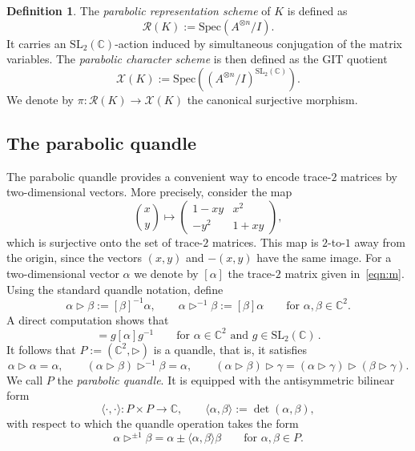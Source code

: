 \documentclass[12pt,reqno]{amsart}
\newcommand{\BC}{\mathbb{C}}
\newcommand{\calX}{\mathcal{X}}
\newcommand{\calR}{\mathcal{R}}
\newcommand{\SL}{\mathrm{SL}}
\theoremstyle{definition}
\newtheorem{definition}[theorem]{Definition}
\begin{document}
	\begin{definition}
		The \emph{parabolic representation scheme} of $K$ is defined as 
		$$ 
            \calR(K) := \mathrm{Spec} \left( A^{\otimes n} / I \right).
        $$
		It carries an $\SL_2(\BC)$-action induced by simultaneous conjugation of the matrix variables. The \emph{parabolic character scheme} is then defined as the GIT quotient
		$$ 
            \calX(K) :=  \mathrm{Spec} \left(\left( A^{\otimes n} / I \right)^{\mathrm{SL}_2(\BC)} \right).
        $$		
		We denote by $\pi :  \calR(K) \rightarrow \calX(K)$ the canonical surjective morphism.
	\end{definition}
	
	\subsection{The parabolic quandle}
	
	The parabolic quandle provides a convenient way to encode trace-$2$ matrices by two-dimensional vectors. More precisely, consider the map
	\begin{equation} \label{eqn:m}
		\binom{x}{y} \longmapsto
		\begin{pmatrix}
			1-xy & x^2 \\
			-y^2 & 1+xy
		\end{pmatrix},
	\end{equation}
	which is surjective onto the set of trace-$2$ matrices. This map is $2$-to-$1$ away from the origin, since the vectors $(x,y)$ and $-(x,y)$ have the same image. For a two-dimensional vector $\alpha$ we denote by $[\alpha]$ the trace-$2$ matrix given in~\eqref{eqn:m}. Using the standard quandle notation,  define
	\begin{equation*}
		\alpha \triangleright \beta:=[\beta]^{-1} \alpha, \qquad
		\alpha\triangleright^{-1}\beta:=[\beta]\alpha \qquad \text{for } \alpha,\beta\in\BC^2.
	\end{equation*}
	A direct computation shows that
	\begin{equation*}
		[g \alpha]=g[\alpha]g^{-1} \qquad
		\text{for } \alpha\in\BC^2\text{ and }g\in\SL_2(\BC)\,.
	\end{equation*}
	It follows that $P:=(\BC^2,\triangleright)$ is a quandle, that is, it satisfies
	$$
	   \alpha \triangleright \alpha= \alpha, \qquad
	   (\alpha \triangleright \beta)\triangleright^{-1}\beta=\alpha, \qquad
      (\alpha\triangleright \beta)\triangleright \gamma = (\alpha\triangleright \gamma)\triangleright( \beta\triangleright \gamma).
	$$
	We call $P$ the \emph{parabolic quandle}. It is equipped with the antisymmetric bilinear form
	$$
	   \langle\cdot,\cdot\rangle\colon P\times P\longrightarrow\BC, \qquad \langle \alpha,\beta \rangle:=\det( \alpha,\beta),
	$$
	with respect to which the quandle operation takes the form
	$$
	   \alpha\triangleright^{\pm1}\beta = \alpha \pm\langle \alpha,\beta\rangle \beta \qquad \text{for } \alpha,\beta \in P.
	$$
	
\end{document}
